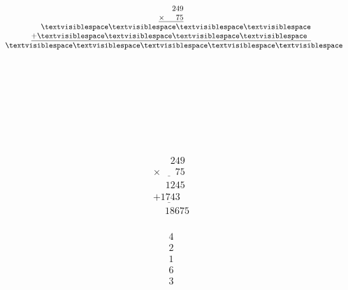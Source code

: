 \begin{minipage}[t]{0.3\linewidth}
\begin{align*}\begin{array}{c}
\phantom{
\times00
}
249\\
\underline{
\times
\phantom{
000
}
75
}\\
\phantom{
+0
}
\textvisiblespace
\textvisiblespace
\textvisiblespace
\textvisiblespace
\\
\underline{
+
\textvisiblespace
\textvisiblespace
\textvisiblespace
\textvisiblespace
\phantom0
}
\\
\phantom{+}
\textvisiblespace
\textvisiblespace
\textvisiblespace
\textvisiblespace
\textvisiblespace
\end{array}\end{align*}
\end{minipage}
\begin{minipage}[t]{0.05\linewidth}
\begin{align*}\begin{array}{c}
\textvisiblespace
\\
\textvisiblespace
\\
\textvisiblespace
\\
\textvisiblespace
\\
\textvisiblespace
\end{array}\end{align*}
\end{minipage}
\begin{minipage}[t]{0.05\linewidth}
\begin{align*}\begin{array}{c}
\textvisiblespace
\end{array}\end{align*}
\end{minipage}
\begin{minipage}[t]{0.3\linewidth}
\begin{align*}\begin{array}{c}
\phantom{
\times00
}
249\\
\underline{
\times
\phantom{
000
}
75
}\\
\phantom{
+0
}
1245
\\
\underline{
+
1743
\phantom0
}
\\
\phantom{+}
18675
\end{array}\end{align*}
\end{minipage}
\begin{minipage}[t]{0.05\linewidth}
\begin{align*}\begin{array}{c}
4
\\
2
\\
1
\\
6
\\
3
\end{array}\end{align*}
\end{minipage}
